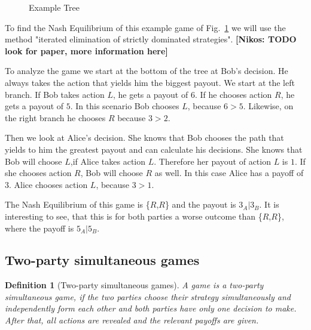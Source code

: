 \documentclass{cacthesis}
\newcommand{\authnote}[3]{{ \footnotesize \textbf{#1[#2: #3]~}}}
\newcommand{\niknote}[1]{\authnote{\color{red}}{Nikos}{#1}}
\newtheorem{definition}{Definition}
\begin{document}
\begin{figure}[htb!]
    \centering
    \caption{Example Tree}
    \label{fig:example-tree}
\end{figure}

To find the Nash Equilibrium of this example game of Fig.~\ref{fig:example-tree} we will use the method "iterated elimination of strictly dominated strategies".
\niknote{TODO look for paper,  more information here}\newline

To analyze the game we start at the bottom of the tree at Bob's decision. He always takes the action that yields him the biggest payout.  We start at the left branch. If Bob takes action $L$, he gets a payout of $6$. If he chooses action $R$, he gets a payout of $5$. In this scenario Bob chooses $L$, because $6>5$.
Likewise, on the right branch he chooses $R$ because $3>2$.\newline

Then we look at Alice's decision. She knows that Bob chooses the path that yields to him the greatest payout and can calculate his decisions. She knows that Bob will choose $L$,if Alice takes action $L$. Therefore her payout of action $L$ is $1$. If she chooses action $R$, Bob will choose $R$ as well. In this case Alice has a payoff of $3$. Alice chooses action $L$, because $3>1$.\newline

The Nash Equilibrium of this game is \{$R$,$R$\} and the payout is $3_A | 3_B$. It is interesting to see, that this is for both parties a worse outcome than \{$R$,$R$\}, where the payoff is $5_A|5_B$.
\subsection{Two-party simultaneous games}
\begin{definition}[Two-party simultaneous games]
\label{def:simultaneous-game}
A game is a two-party simultaneous game, if the two parties choose their strategy simultaneously and independently form each other and both parties have only one decision to make. After that, all actions are revealed and the relevant payoffs are given. 
\end{definition}
\end{document}
